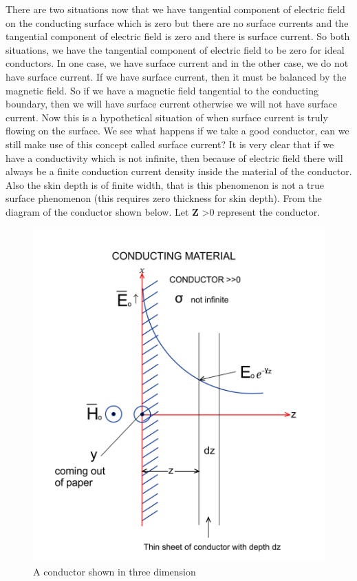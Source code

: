 There are two situations now that we have tangential component of electric field on the conducting surface which is zero but there are no surface currents and the tangential component of electric field is zero and there is surface current. So both situations, we have the tangential component of electric field to be zero for ideal conductors. In one case, we have surface current and in the other case, we do not have surface current. If we have surface current, then it must be balanced by the magnetic field. So if we have a magnetic field tangential to the conducting boundary, then we will have surface current otherwise we will not have surface current. Now this is a hypothetical situation of when surface current is truly flowing on the surface. We see what happens if we take a good conductor, can we still make use of this concept called surface current? It is very clear that if we have a conductivity which is not infinite, then because of electric field there will always be a finite conduction current density inside the material of the conductor. Also the skin depth is of finite width, that is this phenomenon is not a true surface phenomenon (this requires zero thickness for skin depth). From the diagram of the conductor shown below. Let \textbf{Z} \textgreater 0 represent the conductor.
\begin{figure}[h]
\centering
\includegraphics[scale=0.1]{./graphics/Bello282}
\caption{A conductor shown in three dimension}
\end{figure}	

